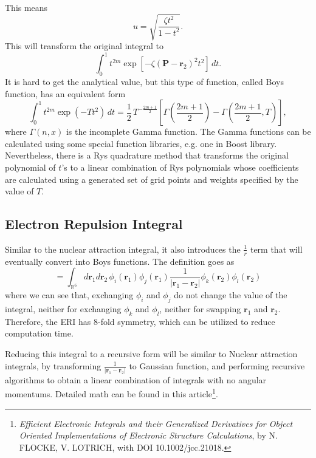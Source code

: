 \documentclass[12pt,a4paper,openany,twoside]{article}
\numberwithin{equation}{section}
\begin{document}
This means
\begin{equation}
    u = \sqrt{\frac{\zeta t^2}{1-t^2}}.
\end{equation}
This will transform the original integral to
\[
    \int_0^1 t^{2m} \exp\left[-\zeta (\boldsymbol{P}-\boldsymbol{r}_2)^2t^2\right]\, dt.
\]
It is hard to get the analytical value, but this type of function, called Boys function, has an equivalent form
\begin{equation}
    \int _0^1 t^{2m} \exp(-Tt^2) \, dt = \frac{1}{2} \, T^{-\frac{2m+1}{2}}\left[\Gamma\left(\frac{2m+1}{2}\right) -  \Gamma\left(\frac{2m+1}{2},T\right)\right],
\end{equation}
where $\Gamma(n,x)$ is the incomplete Gamma function. The Gamma functions can be calculated using some special function libraries, e.g. one in Boost library. Nevertheless, there is a Rys quadrature method that transforms the original polynomial of $t$'s to a linear combination of Rys polynomials whose coefficients are calculated using a generated set of grid points and weights specified by the value of $T$.

\subsection{Electron Repulsion Integral}
Similar to the nuclear attraction integral, it also introduces the $\frac{1}{r}$ term that will eventually convert into Boys functions. The definition goes as
\begin{equation}
    [ij|kl] = \int_{\mathbb{R}^6} d\boldsymbol{r}_1 d\boldsymbol{r}_2\, \phi_i(\boldsymbol{r}_1) \phi_j(\boldsymbol{r}_1) \frac{1}{|\boldsymbol{r}_1 - \boldsymbol{r}_2|} \phi_k(\boldsymbol{r}_2) \phi_l(\boldsymbol{r}_2)
\end{equation}
where we can see that, exchanging $\phi_i$ and $\phi_j$ do not change the value of the integral, neither for exchanging $\phi_k$ and $\phi_l$, neither for swapping $\boldsymbol{r}_1$ and $\boldsymbol{r}_2$. Therefore, the ERI has 8-fold symmetry, which can be utilized to reduce computation time.

Reducing this integral to a recursive form will be similar to Nuclear attraction integrals, by transforming $\frac{1}{|\boldsymbol{r}_1 - \boldsymbol{r}_2 |}$ to Gaussian function, and performing recursive algorithms to obtain a linear combination of integrals with no angular momentums. Detailed math can be found in this article\footnote{\emph{Efficient Electronic Integrals and their Generalized Derivatives for Object Oriented Implementations of Electronic Structure Calculations}, by N. FLOCKE, V. LOTRICH, with DOI 10.1002/jcc.21018.}.
\end{document}

